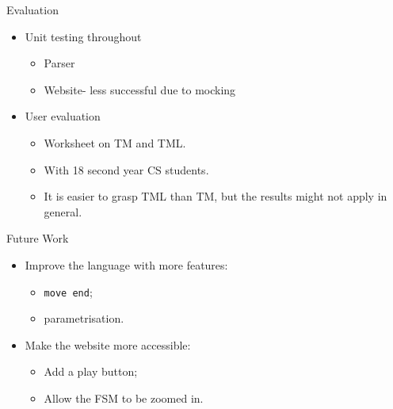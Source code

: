\documentclass{beamer}
\begin{document}
    \begin{frame}{Evaluation}
        \begin{itemize}
            \item Unit testing throughout
            \begin{itemize}
                \item Parser
                \item Website- less successful due to mocking
            \end{itemize}
            \item User evaluation
            \begin{itemize}
                \item Worksheet on TM and TML.
                \item With 18 second year CS students.
                \item It is easier to grasp TML than TM, but the results might not apply in general.
            \end{itemize}
        \end{itemize}
    \end{frame}

    \begin{frame}{Future Work}
        \begin{itemize}
            \item Improve the language with more features:
            \begin{itemize}
                \item \texttt{move end};
                \item parametrisation.
            \end{itemize}
            \item Make the website more accessible:
            \begin{itemize}
                \item Add a play button;
                \item Allow the FSM to be zoomed in.
            \end{itemize}
        \end{itemize}
    \end{frame}
    
\end{document}

